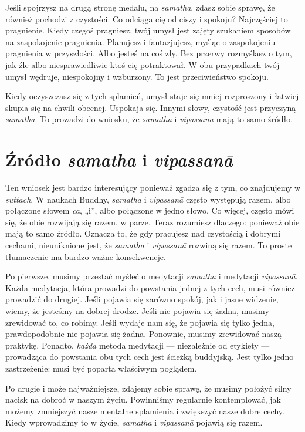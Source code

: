 \documentclass[12pt,openany]{book}
\begin{document}
Jeśli spojrzysz na drugą stronę medalu, na \textit{samatha}, zdasz sobie sprawę, że również pochodzi z czystości. Co odciąga cię od ciszy i spokoju? Najczęściej to pragnienie. Kiedy czegoś pragniesz, twój umysł jest zajęty szukaniem sposobów na zaspokojenie pragnienia. Planujesz i fantazjujesz, myśląc o zaspokojeniu pragnienia w przyszłości. Albo jesteś na coś zły. Bez przerwy rozmyślasz o tym, jak źle albo niesprawiedliwie ktoś cię potraktował. W obu przypadkach twój umysł wędruje, niespokojny i wzburzony. To jest przeciwieństwo spokoju.

Kiedy oczyszczasz się z tych splamień, umysł staje się mniej rozproszony i łatwiej skupia się na chwili obecnej. Uspokaja się. Innymi słowy, czystość jest przyczyną \textit{samatha}. To prowadzi do wniosku, że \textit{samatha} i \textit{vipassanā} mają to samo źródło.

\chapter*{Źródło \textit{samatha} i \textit{vipassanā}}

Ten wniosek jest bardzo interesujący ponieważ zgadza się z tym, co znajdujemy w \textit{suttach}. W naukach Buddhy, \textit{samatha} i \textit{vipassanā} często występują razem, albo połączone słowem \textit{ca}, „i”, albo połączone w jedno słowo. Co więcej, często mówi się, że obie rozwijają się razem, w parze. Teraz rozumiesz dlaczego: ponieważ obie mają to samo źródło. Oznacza to, że gdy pracujesz nad czystością i dobrymi cechami, nieuniknione jest, że \textit{samatha} i \textit{vipassanā} rozwiną się razem. To proste tłumaczenie ma bardzo ważne konsekwencje.

Po pierwsze, musimy przestać myśleć o medytacji \textit{samatha} i medytacji \textit{vipassanā}. Każda medytacja, która prowadzi do powstania jednej z tych cech, musi również prowadzić do drugiej. Jeśli pojawia się zarówno spokój, jak i jasne widzenie, wiemy, że jesteśmy na dobrej drodze. Jeśli nie pojawia się żadna, musimy zrewidować to, co robimy. Jeśli wydaje nam się, że pojawia się tylko jedna, prawdopodobnie nie pojawia się żadna. Ponownie, musimy zrewidować naszą praktykę. Ponadto, \textit{każda} metoda medytacji --- niezależnie od etykiety --- prowadząca do powstania obu tych cech jest ścieżką buddyjską. Jest tylko jedno zastrzeżenie: musi być poparta właściwym poglądem.

Po drugie i może najważniejsze, zdajemy sobie sprawę, że musimy położyć silny nacisk na dobroć w naszym życiu. Powinniśmy regularnie kontemplować, jak możemy zmniejszyć nasze mentalne splamienia i zwiększyć nasze dobre cechy. Kiedy wprowadzimy to w życie, \textit{samatha} i \textit{vipassanā} pojawią się razem.
\end{document}
